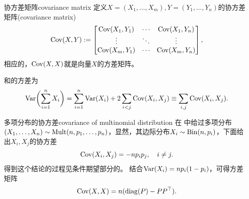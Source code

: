 \begin{definition}{协方差矩阵}{covariance matrix}
	定义$X = (X_1,\ldots,X_m),Y = (Y_1,\ldots,Y_n)$的协方差矩阵(covariance matrix)
	\begin{equation}
		\operatorname{Cov}(X,Y) := \begin{bmatrix}
			\operatorname{Cov}(X_1,Y_1)&\cdots&\operatorname{Cov}(X_1,Y_n)\\
			\vdots&\ddots&\vdots\\
			\operatorname{Cov}(X_m,Y_1)&\cdots&\operatorname{Cov}(X_m,Y_n)
		\end{bmatrix},
	\end{equation}
	相应的，$\operatorname{Cov}(X,X)$就是向量$X$的方差矩阵。
\end{definition}
\begin{corollary}
	和的方差为
	\begin{equation}
		\operatorname{Var}\biggl(\sum_{i=1}^nX_i\biggr) = \sum_{i=1}^n\operatorname{Var}(X_i) + 2\sum_{i<j}\operatorname{Cov}(X_i,X_j) \equiv \sum_{i,j}\operatorname{Cov}(X_i,X_j).
	\end{equation}
\end{corollary}
\begin{example}{多项分布的协方差}{covariance of multinomial distribution}
	在 中给过多项分布$(X_1,\ldots,X_n) \sim \operatorname{Mult}(n,p_1,\ldots,p_n)$，显然，其边际分布$X_i \sim \operatorname{Bin}(n,p_i)$，下面给出$X_i,X_j$的协方差
	\begin{equation}
		\operatorname{Cov}(X_i,X_j) = -np_ip_j,\quad i \neq j.
	\end{equation}
	得到这个结论的过程见条件期望部分的。
	结合$\operatorname{Var}(X_i) = np_i(1 - p_i)$，可得方差矩阵
	\begin{equation}
		\operatorname{Cov}(X,X) = n(\operatorname{diag}(P) - PP^\top).
	\end{equation}
\end{example}
